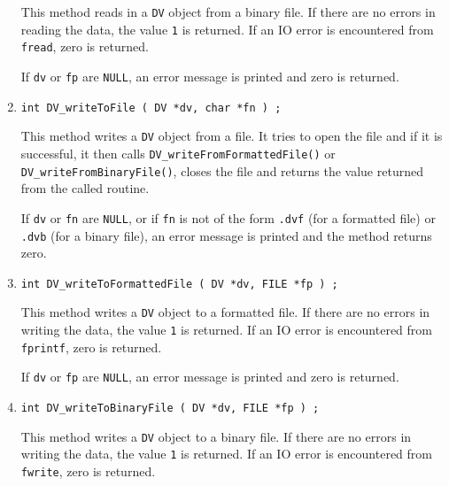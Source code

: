 \begin{enumerate}
\par
This method reads in a {\tt DV} object from a binary file.
If there are no errors in reading the data, 
the value {\tt 1} is returned.
If an IO error is encountered from {\tt fread}, zero is returned.
\par {}
If {\tt dv} or {\tt fp} are {\tt NULL},
an error message is printed and zero is returned.
\item
\begin{verbatim}
int DV_writeToFile ( DV *dv, char *fn ) ;
\end{verbatim}
\par
This method writes a {\tt DV} object from a file.
It tries to open the file and if it is successful, 
it then calls {\tt DV\_writeFromFormattedFile()} or
{\tt DV\_writeFromBinaryFile()},
closes the file
and returns the value returned from the called routine.
\par {}
If {\tt dv} or {\tt fn} are {\tt NULL}, 
or if {\tt fn} is not of the form
{\tt *.dvf} (for a formatted file) 
or {\tt *.dvb} (for a binary file),
an error message is printed and the method returns zero.
\item
\begin{verbatim}
int DV_writeToFormattedFile ( DV *dv, FILE *fp ) ;
\end{verbatim}
\par
This method writes a {\tt DV} object to a formatted file.
If there are no errors in writing the data, 
the value {\tt 1} is returned.
If an IO error is encountered from {\tt fprintf}, zero is returned.
\par {}
If {\tt dv} or {\tt fp} are {\tt NULL},
an error message is printed and zero is returned.
\item
\begin{verbatim}
int DV_writeToBinaryFile ( DV *dv, FILE *fp ) ;
\end{verbatim}
\par
This method writes a {\tt DV} object to a binary file.
If there are no errors in writing the data, 
the value {\tt 1} is returned.
If an IO error is encountered from {\tt fwrite}, zero is returned.

\end{enumerate}
